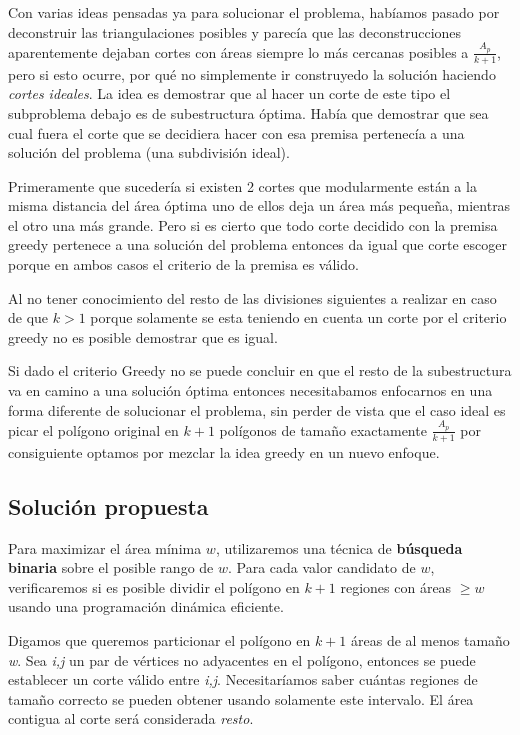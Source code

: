 \documentclass{article}
\begin{document}
Con varias ideas pensadas ya para solucionar el problema, hab\'{i}amos pasado por deconstruir las triangulaciones posibles y parec\'{i}a que las deconstrucciones aparentemente dejaban cortes con \'{a}reas siempre lo m\'{a}s cercanas posibles a $\frac{A_p}{k+1}$, pero si esto ocurre, por qu\'{e} no simplemente ir construyedo la soluci\'{o}n haciendo \textit{cortes ideales}. La idea es demostrar que al hacer un corte de este tipo el subproblema debajo es de subestructura \'{o}ptima. Hab\'{i}a que demostrar que sea cual fuera el corte que se decidiera hacer con esa premisa pertenec\'{i}a a una soluci\'{o}n del problema (una subdivisi\'{o}n ideal).


Primeramente que suceder\'{i}a si existen 2 cortes que modularmente est\'{a}n a la misma distancia del \'{a}rea \'{o}ptima uno de ellos deja un \'{a}rea m\'{a}s peque\~{n}a, mientras el otro una m\'{a}s grande. Pero si es cierto que todo corte decidido con la premisa greedy pertenece a una soluci\'{o}n del problema entonces da igual que corte escoger porque en ambos casos el criterio de la premisa es v\'{a}lido.


Al no tener conocimiento del resto de las divisiones siguientes a realizar en caso de que $k>1$ porque solamente se esta teniendo en cuenta un corte por el criterio greedy no es posible demostrar que es igual.


Si dado el criterio Greedy no se puede concluir en que el resto de la subestructura va en camino a una soluci\'{o}n \'{o}ptima entonces necesitabamos enfocarnos en una forma diferente de solucionar el problema, sin perder de vista que el caso ideal es picar el pol\'{i}gono original en $k+1$ pol\'{i}gonos de tama\~{n}o exactamente $\frac{A_p}{k+1}$ por consiguiente optamos por mezclar la idea greedy en un nuevo enfoque.


\subsection{Solución propuesta}

Para maximizar el área mínima \( w \), utilizaremos una técnica de \textbf{búsqueda binaria} sobre el posible rango de \( w \). Para cada valor candidato de \( w \), verificaremos si es posible dividir el polígono en \( k+1 \) regiones con áreas \(\geq w\) usando una programación dinámica eficiente.


Digamos que queremos particionar el pol\'{i}gono en $k+1$ \'{a}reas de al menos tama\~{n}o \emph{w}. Sea \emph{i,j} un par de v\'{e}rtices no adyacentes en el pol\'{i}gono, entonces se puede establecer un corte v\'{a}lido entre \emph{i,j}. Necesitar\'{i}amos saber cu\'{a}ntas regiones de tama\~no correcto se pueden obtener usando solamente este intervalo. El \'{a}rea contigua al corte ser\'a considerada \emph{resto}.
\end{document}
